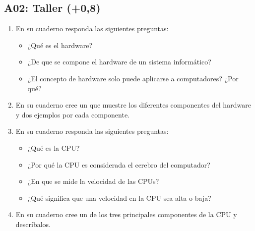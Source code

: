 \documentclass[letterpaper,10pt,spanish]{sphinxmanual}
\begin{document}
\subsection{A02: Taller (+0,8)}
\label{\detokenize{1_guias/8logica/G821:a02-taller-0-8}}
\sphinxAtStartPar
{}
\begin{enumerate}
%
\item {} 
\sphinxAtStartPar
En su cuaderno responda las siguientes preguntas:
\begin{itemize}
\item {} 
\sphinxAtStartPar
¿Qué es el hardware?

\item {} 
\sphinxAtStartPar
¿De que se compone el hardware de un sistema informático?

\item {} 
\sphinxAtStartPar
¿El concepto de hardware solo puede aplicarse a computadores? ¿Por qué?

\end{itemize}

\item {} 
\sphinxAtStartPar
En su cuaderno cree un  que muestre los diferentes componentes del hardware y dos ejemplos por cada componente.

\item {} 
\sphinxAtStartPar
En su cuaderno responda las siguientes preguntas:
\begin{itemize}
\item {} 
\sphinxAtStartPar
¿Qué es la CPU?

\item {} 
\sphinxAtStartPar
¿Por qué la CPU es considerada el cerebro del computador?

\item {} 
\sphinxAtStartPar
¿En que se mide la velocidad de las CPUs?

\item {} 
\sphinxAtStartPar
¿Qué significa que una velocidad en la CPU sea alta o baja?

\end{itemize}

\item {} 
\sphinxAtStartPar
En su cuaderno cree un  de los tres principales componentes de la CPU y descríbalos.


\end{enumerate}
\end{document}
